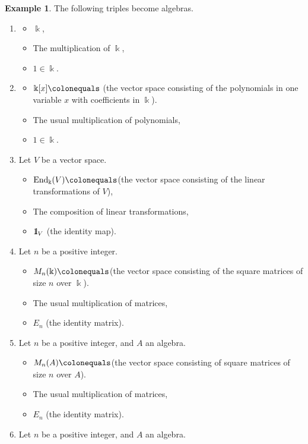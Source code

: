\documentclass{surv-l}
\numberwithin{equation}{chapter}
\numberwithin{figure}{chapter}
\theoremstyle{plain}
\theoremstyle{definition}
\newtheorem{exm}[thm]{Example}
\theoremstyle{remark}
\newcommand{\id}{1\kern-.25em{\text{{\rm l}}}}
\DeclareMathOperator{\End}{End}
\begin{document}
\begin{exm}\label{exm:algebras}
The following triples become algebras.
\begin{enumerate}
\item
\begin{itemize}
\item
$\Bbbk$,
\item
The multiplication of $\Bbbk$,
\item
$1 \in \Bbbk$.
\end{itemize}
\item
\begin{itemize}
\item
$\Bbbk[x]\colonequals $ (the vector space consisting of the polynomials in one variable $x$ with coefficients in $\Bbbk$).
\item
The usual multiplication of polynomials,
\item
$1 \in \Bbbk$.
\end{itemize}
\item
Let $V$ be a vector space.
\begin{itemize}
\item
$\End_{\Bbbk}(V)\colonequals $(the vector space consisting of the linear transformations of $V$),
\item
The composition of linear transformations,
\item
$\id_V$ (the identity map).
\end{itemize}
\item
Let $n$ be a positive integer.
\begin{itemize}
\item
$M_n(\Bbbk)\colonequals $(the vector space consisting of the square matrices of size $n$ over $\Bbbk$).
\item
The usual multiplication of matrices,
\item
$E_n$ (the identity matrix).
\end{itemize}
\item[($4'$)]
Let $n$ be a positive integer, and $A$ an algebra.
\begin{itemize}
\item
$M_n(A)\colonequals $(the vector space consisting of square matrices of size $n$ over $A$).
\item
The usual multiplication of matrices,
\item
$E_n$ (the identity matrix).
\end{itemize}
\item
Let $n$ be a positive integer, and $A$ an algebra.
\begin{itemize}

\end{itemize}
\end{enumerate}
\end{exm}
\end{document}
